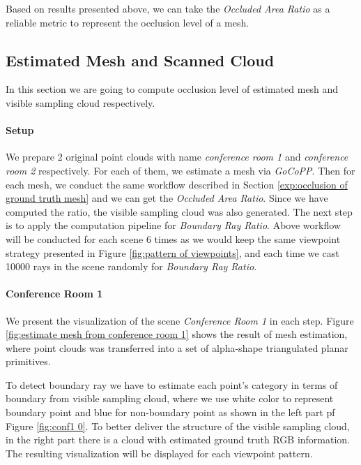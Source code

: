 \documentclass[11pt, a4paper,oneside,chapterprefix=false]{scrbook}
\begin{document}
Based on results presented above, we can take the \emph{Occluded Area Ratio} as a reliable metric to represent the occlusion level of a mesh.

\subsection{Estimated Mesh and Scanned Cloud}

In this section we are going to compute occlusion level of estimated mesh and visible sampling cloud respectively. 

\paragraph{Setup}

We prepare 2 original point clouds with name \emph{conference room 1} and \emph{conference room 2} respectively. For each of them, we estimate a mesh via \emph{GoCoPP}. Then for each mesh, we conduct the same workflow described in Section \ref{exp:occlusion of ground truth mesh} and we can get the \emph{Occluded Area Ratio}. Since we have computed the ratio, the visible sampling cloud was also generated. The next step is to apply the computation pipeline for \emph{Boundary Ray Ratio}. Above workflow will be conducted for each scene 6 times as we would keep the same viewpoint strategy presented in Figure \ref{fig:pattern of viewpoints}, and each time we cast 10000 rays in the scene randomly for \emph{Boundary Ray Ratio}.    

\paragraph{Conference Room 1} \label{par:conf1 result}

We present the visualization of the scene \emph{Conference Room 1} in each step. Figure \ref{fig:estimate mesh from conference room 1} shows the result of mesh estimation, where point clouds was transferred into a set of alpha-shape triangulated planar primitives.

\vspace{10pt}

To detect boundary ray we have to estimate each point's category in terms of boundary from visible sampling cloud, where we use white color to represent boundary point and blue for non-boundary point as shown in the left part pf Figure \ref{fig:conf1 0}. To better deliver the structure of the visible sampling cloud, in the right part there is a cloud with estimated ground truth RGB information. The resulting visualization will be displayed for each viewpoint pattern.
\end{document}
